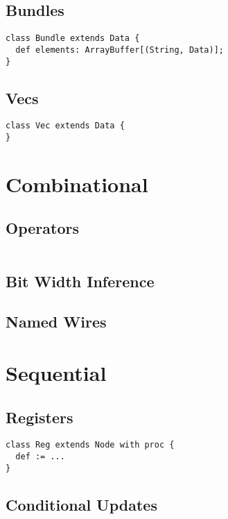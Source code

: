 \documentclass[10pt,twocolumn]{article}
\begin{document}
\subsection{Bundles}

\begin{verbatim}
class Bundle extends Data {
  def elements: ArrayBuffer[(String, Data)];
}
\end{verbatim}

\subsection{Vecs}

\begin{verbatim}
class Vec extends Data {
}
\end{verbatim}

\section{Combinational}

\subsection{Operators}

\begin{verbatim}
\end{verbatim}

\subsection{Bit Width Inference}

\subsection{Named Wires}

\section{Sequential}

\subsection{Registers}

\begin{verbatim}
class Reg extends Node with proc {
  def := ...
}
\end{verbatim}

\subsection{Conditional Updates}
\end{document}
